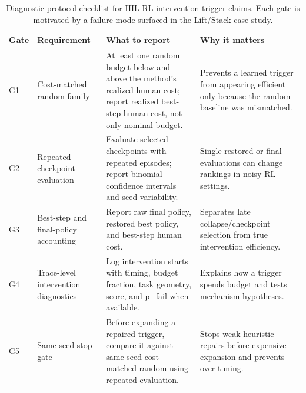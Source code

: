 \begin{table}[t]
\centering
\caption{Diagnostic protocol checklist for HIL-RL intervention-trigger claims. Each gate is motivated by a failure mode surfaced in the Lift/Stack case study.}
\label{tab:protocol_checklist}
\begin{tabular}{p{}p{}p{}p{}}
\toprule
Gate & Requirement & What to report & Why it matters \\
\midrule
G1 & Cost-matched random family & At least one random budget below and above the method's realized human cost; report realized best-step human cost, not only nominal budget. & Prevents a learned trigger from appearing efficient only because the random baseline was mismatched. \\
G2 & Repeated checkpoint evaluation & Evaluate selected checkpoints with repeated episodes; report binomial confidence intervals and seed variability. & Single restored or final evaluations can change rankings in noisy RL settings. \\
G3 & Best-step and final-policy accounting & Report raw final policy, restored best policy, and best-step human cost. & Separates late collapse/checkpoint selection from true intervention efficiency. \\
G4 & Trace-level intervention diagnostics & Log intervention starts with timing, budget fraction, task geometry, score, and p\_fail when available. & Explains how a trigger spends budget and tests mechanism hypotheses. \\
G5 & Same-seed stop gate & Before expanding a repaired trigger, compare it against same-seed cost-matched random using repeated evaluation. & Stops weak heuristic repairs before expensive expansion and prevents over-tuning. \\
\bottomrule
\end{tabular}
\end{table}
